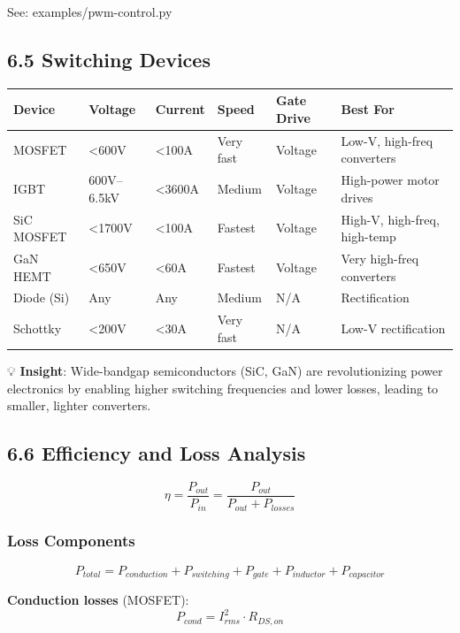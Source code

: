 \documentclass[11pt,a4paper]{book}
\begin{document}
See: examples/pwm-control.py

\medskip\noindent\hrulefill\medskip

\subsection{6.5 Switching Devices}

\begin{center}
\begin{tabular}{|l|l|l|l|l|l|}
\hline
Device & Voltage & Current & Speed & Gate Drive & Best For \\
\hline
MOSFET & <600V & <100A & Very fast & Voltage & Low-V, high-freq converters \\
IGBT & 600V–6.5kV & <3600A & Medium & Voltage & High-power motor drives \\
SiC MOSFET & <1700V & <100A & Fastest & Voltage & High-V, high-freq, high-temp \\
GaN HEMT & <650V & <60A & Fastest & Voltage & Very high-freq converters \\
Diode (Si) & Any & Any & Medium & N/A & Rectification \\
Schottky & <200V & <30A & Very fast & N/A & Low-V rectification \\
\hline
\end{tabular}
\end{center}

💡 \textbf{Insight}: Wide-bandgap semiconductors (SiC, GaN) are revolutionizing power electronics by enabling higher switching frequencies and lower losses, leading to smaller, lighter converters.

\medskip\noindent\hrulefill\medskip

\subsection{6.6 Efficiency and Loss Analysis}

\[\eta = \frac{P_{out}}{P_{in}} = \frac{P_{out}}{P_{out} + P_{losses}}\]

\subsubsection{Loss Components}

\[P_{total} = P_{conduction} + P_{switching} + P_{gate} + P_{inductor} + P_{capacitor}\]

\textbf{Conduction losses} (MOSFET):
\[P_{cond} = I_{rms}^2 \cdot R_{DS,on}\]
\end{document}
